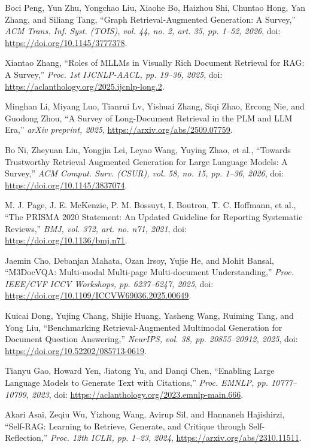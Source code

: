  Boci Peng, Yun Zhu, Yongchao Liu, Xiaohe Bo, Haizhou Shi, Chuntao Hong, Yan Zhang, and Siliang Tang, ``Graph Retrieval-Augmented Generation: A Survey,'' \emph{ACM Trans. Inf. Syst. (TOIS), vol. 44, no. 2, art. 35, pp. 1--52, 2026}, doi: \url{https://doi.org/10.1145/3777378}.

 Xiantao Zhang, ``Roles of MLLMs in Visually Rich Document Retrieval for RAG: A Survey,'' \emph{Proc. 1st IJCNLP-AACL, pp. 19--36, 2025}, doi: \url{https://aclanthology.org/2025.ijcnlp-long.2}.

 Minghan Li, Miyang Luo, Tianrui Lv, Yishuai Zhang, Siqi Zhao, Ercong Nie, and Guodong Zhou, ``A Survey of Long-Document Retrieval in the PLM and LLM Era,'' \emph{arXiv preprint, 2025}, \url{https://arxiv.org/abs/2509.07759}.

 Bo Ni, Zheyuan Liu, Yongjia Lei, Leyao Wang, Yuying Zhao, et al., ``Towards Trustworthy Retrieval Augmented Generation for Large Language Models: A Survey,'' \emph{ACM Comput. Surv. (CSUR), vol. 58, no. 15, pp. 1--36, 2026}, doi: \url{https://doi.org/10.1145/3837074}.

 M. J. Page, J. E. McKenzie, P. M. Bossuyt, I. Boutron, T. C. Hoffmann, et al., ``The PRISMA 2020 Statement: An Updated Guideline for Reporting Systematic Reviews,'' \emph{BMJ, vol. 372, art. no. n71, 2021}, doi: \url{https://doi.org/10.1136/bmj.n71}.

 Jaemin Cho, Debanjan Mahata, Ozan Irsoy, Yujie He, and Mohit Bansal, ``M3DocVQA: Multi-modal Multi-page Multi-document Understanding,'' \emph{Proc. IEEE/CVF ICCV Workshops, pp. 6237--6247, 2025}, doi: \url{https://doi.org/10.1109/ICCVW69036.2025.00649}.

 Kuicai Dong, Yujing Chang, Shijie Huang, Yasheng Wang, Ruiming Tang, and Yong Liu, ``Benchmarking Retrieval-Augmented Multimodal Generation for Document Question Answering,'' \emph{NeurIPS, vol. 38, pp. 20855--20912, 2025}, doi: \url{https://doi.org/10.52202/085713-0619}.

 Tianyu Gao, Howard Yen, Jiatong Yu, and Danqi Chen, ``Enabling Large Language Models to Generate Text with Citations,'' \emph{Proc. EMNLP, pp. 10777--10799, 2023}, doi: \url{https://aclanthology.org/2023.emnlp-main.666}.

 Akari Asai, Zeqiu Wu, Yizhong Wang, Avirup Sil, and Hannaneh Hajishirzi, ``Self-RAG: Learning to Retrieve, Generate, and Critique through Self-Reflection,'' \emph{Proc. 12th ICLR, pp. 1--23, 2024}, \url{https://arxiv.org/abs/2310.11511}.

